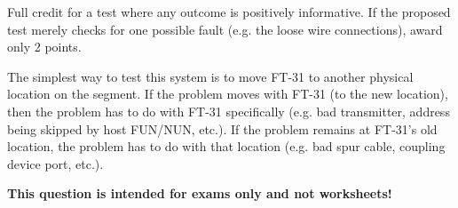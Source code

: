 Full credit for a test where any outcome is positively informative.  If the proposed test merely checks for one possible fault (e.g. the loose wire connections), award only 2 points.

\vskip 10pt

The simplest way to test this system is to move FT-31 to another physical location on the segment.  If the problem moves with FT-31 (to the new location), then the problem has to do with FT-31 specifically (e.g. bad transmitter, address being skipped by host FUN/NUN, etc.).  If the problem remains at FT-31's old location, the problem has to do with that location (e.g. bad spur cable, coupling device port, etc.).







{\bf This question is intended for exams only and not worksheets!}



